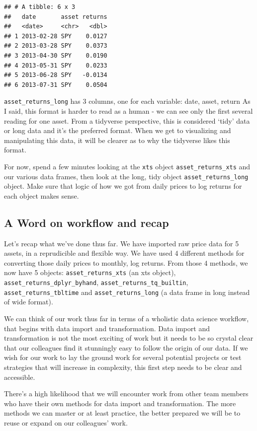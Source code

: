 \documentclass[]{krantz}
\begin{document}
\begin{verbatim}
## # A tibble: 6 x 3
##   date       asset returns
##   <date>     <chr>   <dbl>
## 1 2013-02-28 SPY    0.0127
## 2 2013-03-28 SPY    0.0373
## 3 2013-04-30 SPY    0.0190
## 4 2013-05-31 SPY    0.0233
## 5 2013-06-28 SPY   -0.0134
## 6 2013-07-31 SPY    0.0504
\end{verbatim}

\texttt{asset\_returns\_long} has 3 columns, one for each variable:
date, asset, return As I said, this format is harder to read as a human
- we can see only the first several reading for one asset. From a
tidyverse perspective, this is considered `tidy' data or long data and
it's the preferred format. When we get to visualizing and manipulating
this data, it will be clearer as to why the tidyverse likes this format.

For now, spend a few minutes looking at the \texttt{xts} object
\texttt{asset\_returns\_xts} and our various data frames, then look at
the long, tidy object \texttt{asset\_returns\_long} object. Make sure
that logic of how we got from daily prices to log returns for each
object makes sense.

\subsection*{A Word on workflow and
recap}\label{a-word-on-workflow-and-recap}


Let's recap what we've done thus far. We have imported raw price data
for 5 assets, in a reprudicible and flexible way. We have used 4
different methods for converting those daily prices to monthly, log
returns. From those 4 methods, we now have 5 objects:
\texttt{asset\_returns\_xts} (an xts object),
\texttt{asset\_returns\_dplyr\_byhand},
\texttt{asset\_returns\_tq\_builtin}, \texttt{asset\_returns\_tbltime}
and \texttt{asset\_returns\_long} (a data frame in long instead of wide
format).

We can think of our work thus far in terms of a wholistic data science
workflow, that begins with data import and transformation. Data import
and transformation is not the most exciting of work but it needs to be
so crystal clear that our colleagues find it stunningly easy to follow
the origin of our data. If we wish for our work to lay the ground work
for several potential projects or test strategies that will increase in
complexity, this first step needs to be clear and accessible.

There's a high likelihood that we will encounter work from other team
members who have their own methods for data import and transformation.
The more methods we can master or at least practice, the better prepared
we will be to reuse or expand on our colleagues' work.
\end{document}
